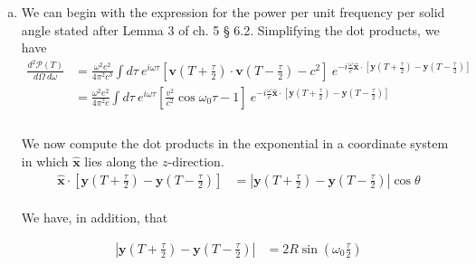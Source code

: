 \documentclass[]{article}
\begin{document}
\begin{enumerate}[a)]

\item We can begin with the expression for the power per unit frequency per solid angle stated after Lemma 3 of ch. 5 § 6.2. Simplifying the dot products, we have \\

\begin{equation}
\begin{aligned}
\frac{  d^2 \mathscr{P} (T) }{ d\Omega \: d\omega} & = \frac{ \omega^2 e^2}{ 4 \pi^2 c^3 } \int d\tau \: e^{ i \omega \tau }  \left[ \bm{v}\left( T + \frac{\tau}{2} \right) \cdot   \bm{v}\left( T -\frac{\tau}{2} \right) - c^2 \right] \: e^{  - i \frac{\omega}{c} \hat{\bm{x}} \cdot \left[  \bm{y}\left( T + \frac{\tau}{2}  \right) - \bm{y}\left( T - \frac{\tau}{2}  \right) \right] }    \\
%
& = \frac{ \omega^2 e^2}{ 4 \pi^2 c } \int d\tau \: e^{ i \omega \tau }  \left[ \frac{v^2}{c^2} \cos \omega_0 \tau - 1\right] \: e^{  - i \frac{\omega}{c} \hat{\bm{x}} \cdot \left[  \bm{y}\left( T + \frac{\tau}{2}  \right) - \bm{y}\left( T - \frac{\tau}{2}  \right) \right] }    \\
\end{aligned}
\end{equation} \\

We now compute the dot products in the exponential in a coordinate system in which $\hat{\bm{x}}$ lies along the $z$-direction.  \\

\begin{equation}
\begin{aligned}
\hat{\bm{x}} \cdot \left[  \bm{y}\left( T + \frac{\tau}{2}  \right) - \bm{y}\left( T - \frac{\tau}{2}  \right) \right] & = \left|  \bm{y}\left( T + \frac{\tau}{2}  \right) - \bm{y}\left( T - \frac{\tau}{2}  \right)  \right| \cos\theta
\end{aligned}
\end{equation} \\

We have, in addition, that

\begin{equation}
\begin{aligned}
 \left|  \bm{y}\left( T + \frac{\tau}{2}  \right) - \bm{y}\left( T - \frac{\tau}{2}  \right)  \right| & = 2R \sin( \omega_0 \frac{\tau}{2} ) \\
\end{aligned}
\end{equation} \\


\end{enumerate}
\end{document}
